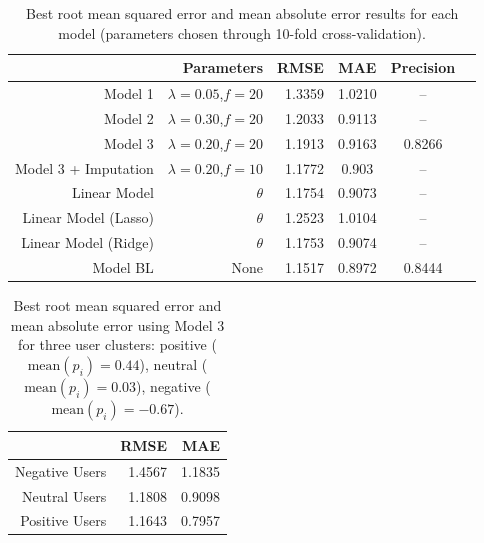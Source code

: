 \documentclass[12pt]{article}
\begin{document}
\newpage

\begin{table}[htbp]
  \centering
  \caption{Best root mean squared error and mean absolute error results for each model (parameters chosen through 10-fold cross-validation).}
    \begin{tabular}{rrrccc}
    \toprule
          & Parameters & RMSE  & MAE & Precision \\
    \midrule
    Model 1 & $\lambda=0.05$,$f=20$ & 1.3359 & 1.0210 & -- \\
    Model 2 & $\lambda=0.30$,$f=20$ & 1.2033 & 0.9113 & --\\
    Model 3 & $\lambda=0.20$,$f=20$ & 1.1913 & 0.9163 & 0.8266\\
    Model 3 + Imputation & $\lambda=0.20$,$f=10$ & 1.1772 & 0.903  & --\\
    Linear Model & $\theta$ & 1.1754 & 0.9073 & --\\
    Linear Model (Lasso) & $\theta$ & 1.2523 & 1.0104 & -- \\
    Linear Model (Ridge) & $\theta$ & 1.1753 & 0.9074 & --\\
    Model BL & None & 1.1517 & 0.8972 & 0.8444 \\
    \bottomrule
    \end{tabular}%
  \label{tab:results}%
\end{table}%

\begin{table}[htbp]
  \centering
  \caption{Best root mean squared error and mean absolute error using Model 3 for three user clusters: positive ($\text{mean}(p_i)=0.44$), neutral ($\text{mean}(p_i)=0.03$), negative ($\text{mean}(p_i)=-0.67$).}
    \begin{tabular}{rrr}
    \toprule
          & RMSE  & MAE \\
    \midrule
    Negative Users & 1.4567 & 1.1835 \\
    Neutral Users & 1.1808 & 0.9098 \\
    Positive Users & 1.1643 & 0.7957 \\
    \bottomrule
    \end{tabular}%
  \label{tab:results_clusters}%
\end{table}%
\end{document}
